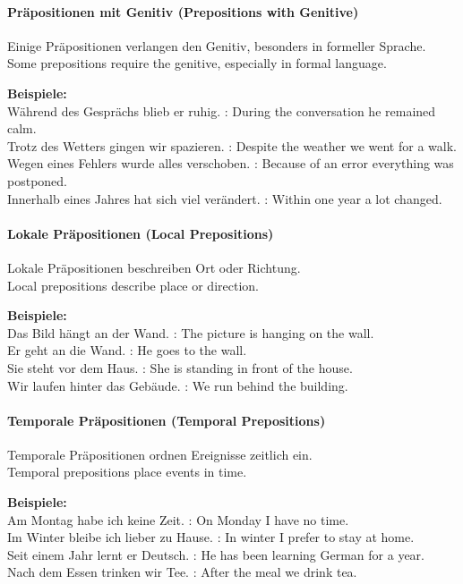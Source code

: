 \documentclass[a4paper]{article}
\begin{document}
        \paragraph{Präpositionen mit Genitiv {\small (Prepositions with Genitive)}}
            Einige Präpositionen verlangen den Genitiv, besonders in formeller Sprache.\\
            Some prepositions require the genitive, especially in formal language.
            
            \textbf{Beispiele:}\\
            Während des Gesprächs blieb er ruhig. : During the conversation he remained calm.\\
            Trotz des Wetters gingen wir spazieren. : Despite the weather we went for a walk.\\
            Wegen eines Fehlers wurde alles verschoben. : Because of an error everything was postponed.\\
            Innerhalb eines Jahres hat sich viel verändert. : Within one year a lot changed.
        
        \paragraph{Lokale Präpositionen {\small (Local Prepositions)}}
            Lokale Präpositionen beschreiben Ort oder Richtung.\\
            Local prepositions describe place or direction.
            
            \textbf{Beispiele:}\\
            Das Bild hängt an der Wand. : The picture is hanging on the wall.\\
            Er geht an die Wand. : He goes to the wall.\\
            Sie steht vor dem Haus. : She is standing in front of the house.\\
            Wir laufen hinter das Gebäude. : We run behind the building.
        
        \paragraph{Temporale Präpositionen {\small (Temporal Prepositions)}}
            Temporale Präpositionen ordnen Ereignisse zeitlich ein.\\
            Temporal prepositions place events in time.
            
            \textbf{Beispiele:}\\
            Am Montag habe ich keine Zeit. : On Monday I have no time.\\
            Im Winter bleibe ich lieber zu Hause. : In winter I prefer to stay at home.\\
            Seit einem Jahr lernt er Deutsch. : He has been learning German for a year.\\
            Nach dem Essen trinken wir Tee. : After the meal we drink tea.
        
\end{document}
